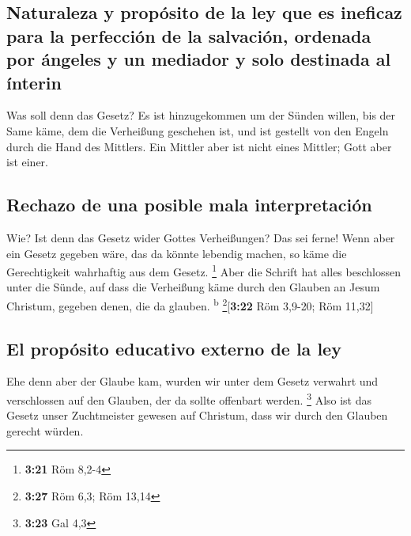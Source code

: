 \hypertarget{naturaleza-y-propuxf3sito-de-la-ley-que-es-ineficaz-para-la-perfecciuxf3n-de-la-salvaciuxf3n-ordenada-por-uxe1ngeles-y-un-mediador-y-solo-destinada-al-uxednterin}{%
\subsection{Naturaleza y propósito de la ley que es ineficaz para la
perfección de la salvación, ordenada por ángeles y un mediador y solo
destinada al
ínterin}\label{naturaleza-y-propuxf3sito-de-la-ley-que-es-ineficaz-para-la-perfecciuxf3n-de-la-salvaciuxf3n-ordenada-por-uxe1ngeles-y-un-mediador-y-solo-destinada-al-uxednterin}}

 Was soll denn das Gesetz? Es ist hinzugekommen um der
Sünden willen, bis der Same käme, dem die Verheißung geschehen ist, und
ist gestellt von den Engeln durch die Hand des Mittlers. 
Ein Mittler aber ist nicht eines Mittler; Gott aber ist einer.

\hypertarget{rechazo-de-una-posible-mala-interpretaciuxf3n}{%
\subsection{Rechazo de una posible mala
interpretación}\label{rechazo-de-una-posible-mala-interpretaciuxf3n}}

 Wie? Ist denn das Gesetz wider Gottes Verheißungen? Das
sei ferne! Wenn aber ein Gesetz gegeben wäre, das da könnte lebendig
machen, so käme die Gerechtigkeit wahrhaftig aus dem Gesetz. \footnote{\textbf{3:21}
  Röm 8,2-4}  Aber die Schrift hat alles beschlossen
unter die Sünde, auf dass die Verheißung käme durch den Glauben an Jesum
Christum, gegeben denen, die da glauben. \textsuperscript{b}
\footnote{\textbf{3:27} Röm 6,3; Röm 13,14}{[}\textbf{3:22} Röm 3,9-20;
Röm 11,32{]}

\hypertarget{el-propuxf3sito-educativo-externo-de-la-ley}{%
\subsection{El propósito educativo externo de la
ley}\label{el-propuxf3sito-educativo-externo-de-la-ley}}

 Ehe denn aber der Glaube kam, wurden wir unter dem
Gesetz verwahrt und verschlossen auf den Glauben, der da sollte
offenbart werden. \footnote{\textbf{3:23} Gal 4,3}  Also
ist das Gesetz unser Zuchtmeister gewesen auf Christum, dass wir durch
den Glauben gerecht würden.

